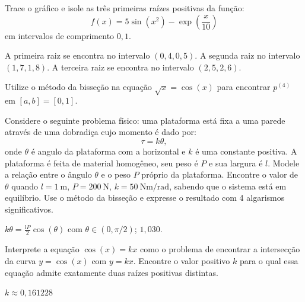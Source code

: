 \begin{Exercise} Trace o gráfico e isole as três primeiras raízes positivas da função:
  \begin{equation*}
    f(x)=5\sin(x^2)-\exp\left({\frac{x}{10}}\right)  
  \end{equation*}
em intervalos de comprimento $0,1$.
\end{Exercise}
\begin{Answer}
  \begin{tiny}
    A primeira raiz se encontra no intervalo $(0,4, 0,5)$. A segunda raiz no intervalo $(1,7, 1,8)$. A terceira raiz se encontra no intervalo $(2,5, 2,6)$.    
  \end{tiny}
\end{Answer}

\begin{Exercise}Utilize o método da bisseção na equação $\sqrt{x}=\cos(x)$ para encontrar $p^{(4)}$ em $[a,b]=[0, 1]$.
\end{Exercise}

\begin{Exercise}[title=Estática] Considere o seguinte problema físico: uma plataforma está fixa a uma parede através de uma dobradiça cujo momento é dado por:
  \begin{equation*}
    \tau=k\theta,
  \end{equation*}
onde $\theta$ é angulo da plataforma com a horizontal e $k$ é uma constante positiva. A plataforma é feita de material homogêneo, seu peso é $P$ e sua largura é $l$. Modele a relação entre o ângulo $\theta$ e o peso $P$ próprio da plataforma. Encontre o valor de $\theta$ quando $l=1~\mbox{m}$, $P=200~\mbox{N}$, $k=50~\mbox{Nm}/\mbox{rad}$, sabendo que o sistema está em equilíbrio. Use o método da bisseção e expresse o resultado com 4 algarismos significativos.
\end{Exercise}
\begin{Answer}
  \begin{tiny}
    $k\theta=\frac{lP}{2}\cos(\theta)$ com $\theta\in (0, \pi/2)$; $1,030$.
  \end{tiny}
\end{Answer}

\begin{Exercise} Interprete a equação $\cos(x)=kx$ como o problema de encontrar a intersecção da curva $y=\cos(x)$ com $y=kx$. Encontre o valor positivo $k$ para o qual essa equação admite exatamente duas raízes positivas distintas.
\end{Exercise}
\begin{Answer}
  \begin{tiny}
    $k\approx 0,161228$
  \end{tiny}
\end{Answer}

